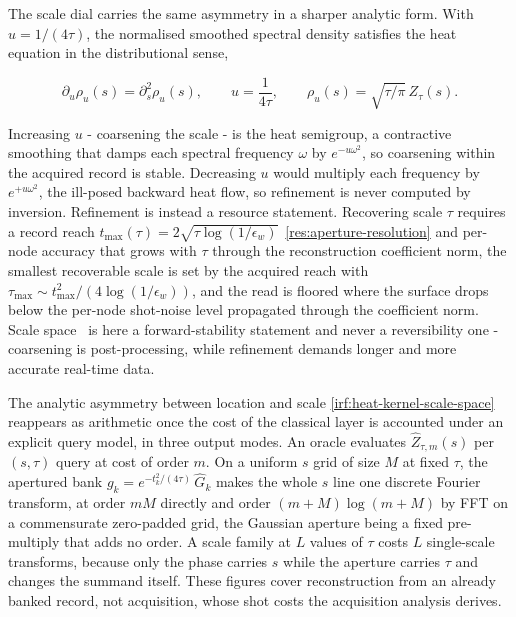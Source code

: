 The scale dial carries the same asymmetry in a sharper analytic form. With $u=1/(4\tau)$, the normalised smoothed spectral density satisfies the heat equation in the distributional sense,
\begin{widetext}
\begin{equation}\label{irf:heat-kernel-scale-space}
\partial_u\rho_u(s)=\partial_s^{2}\rho_u(s),\qquad u=\frac{1}{4\tau},\qquad \rho_u(s)=\sqrt{\tau/\pi}\,Z_\tau(s).
\end{equation}
\end{widetext}
Increasing $u$ - coarsening the scale - is the heat semigroup, a contractive smoothing that damps each spectral frequency $\omega$ by $e^{-u\omega^{2}}$, so coarsening within the acquired record is stable. Decreasing $u$ would multiply each frequency by $e^{+u\omega^{2}}$, the ill-posed backward heat flow, so refinement is never computed by inversion. Refinement is instead a resource statement. Recovering scale $\tau$ requires a record reach $t_{\max}(\tau)=2\sqrt{\tau\log(1/\epsilon_w)}$~\eqref{res:aperture-resolution} and per-node accuracy that grows with $\tau$ through the reconstruction coefficient norm, the smallest recoverable scale is set by the acquired reach with $\tau_{\max}\sim t_{\max}^{2}/(4\log(1/\epsilon_w))$, and the read is floored where the surface drops below the per-node shot-noise level propagated through the coefficient norm. Scale space~\cite{witkin1983scale,koenderink1984structure,lindeberg1994scale} is here a forward-stability statement and never a reversibility one - coarsening is post-processing, while refinement demands longer and more accurate real-time data.

The analytic asymmetry between location and scale \eqref{irf:heat-kernel-scale-space} reappears as arithmetic once the cost of the classical layer is accounted under an explicit query model, in three output modes. An oracle evaluates $\widehat Z_{\tau,m}(s)$ per $(s,\tau)$ query at cost of order $m$. On a uniform $s$ grid of size $M$ at fixed $\tau$, the apertured bank $g_k=e^{-t_k^{2}/(4\tau)}\,\widehat G_k$ makes the whole $s$ line one discrete Fourier transform, at order $mM$ directly and order $(m+M)\log(m+M)$ by FFT on a commensurate zero-padded grid, the Gaussian aperture being a fixed pre-multiply that adds no order. A scale family at $L$ values of $\tau$ costs $L$ single-scale transforms, because only the phase carries $s$ while the aperture carries $\tau$ and changes the summand itself. These figures cover reconstruction from an already banked record, not acquisition, whose shot costs the acquisition analysis derives.

